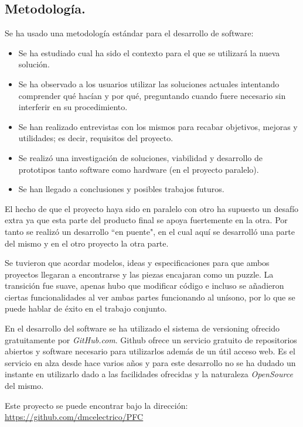  \subsection{Metodología.}
  Se ha usado una metodología estándar para el desarrollo de software: 
  \begin{itemize}
   \item  Se ha estudiado cual ha sido el contexto para el que se utilizará la nueva solución. 
   	\item Se ha observado a los usuarios utilizar las soluciones actuales intentando comprender qué hacían y por qué, preguntando cuando fuere necesario sin interferir en su procedimiento. 
   	\item Se han realizado entrevistas con los mismos para recabar objetivos, mejoras y utilidades; es decir, requisitos del proyecto. 
   	\item Se realizó una investigación de soluciones, viabilidad y desarrollo de prototipos tanto software como hardware (en el proyecto paralelo). 
   	\item Se han llegado a conclusiones y posibles trabajos futuros.
  \end{itemize}
  
  
  El hecho de que el proyecto haya sido en paralelo con otro ha supuesto un desafío extra ya que esta parte del producto final se apoya fuertemente en la otra. Por tanto se realizó un desarrollo ``en puente", en el cual aquí se desarrolló una parte del mismo y en el otro proyecto la otra parte. 
  
  Se tuvieron que acordar modelos, ideas y especificaciones para que ambos proyectos llegaran a encontrarse y las piezas encajaran como un puzzle. La transición fue suave, apenas hubo que modificar código e incluso se añadieron ciertas funcionalidades al ver ambas partes funcionando al unísono, por lo que se puede hablar de éxito en el trabajo conjunto.
  
  
  En el desarrollo del software se ha utilizado el sistema de versioning ofrecido gratuitamente por \emph{GitHub.com}. Github ofrece un servicio gratuito de repositorios abiertos y software necesario para utilizarlos además de un útil acceso web. Es el servicio en alza desde hace varios años y para este desarrollo no se ha dudado un instante en utilizarlo dado a las facilidades ofrecidas y la naturaleza \emph{OpenSource} del mismo.
  
  Este proyecto se puede encontrar bajo la dirección: \url{https://github.com/dmcelectrico/PFC}
